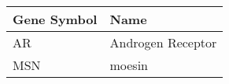 \begin{tabular}{ll}
\toprule
Gene Symbol &              Name \\
\midrule
         AR & Androgen Receptor \\
        MSN &            moesin \\
\bottomrule
\end{tabular}
